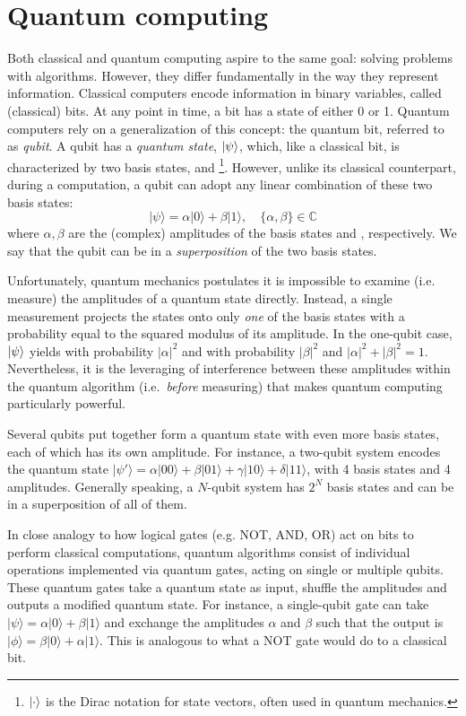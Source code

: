 \section{Quantum computing} \label{sec:intro_quantum_computing}
Both classical and quantum computing aspire to the same goal: solving problems with algorithms. However, they differ fundamentally in the way they represent information. Classical computers encode information in binary variables, called (classical) bits. At any point in time, a bit has a state of either 0 or 1. Quantum computers rely on a generalization of this concept: the quantum bit, referred to as \textit{qubit}. A qubit has a \textit{quantum state}, $\ket{\psi}$, which, like a classical bit, is characterized by two basis states, \0 and \1\footnote{$\ket{\cdot}$ is the Dirac notation for state vectors, often used in quantum mechanics.}. However, unlike its classical counterpart, during a computation, a qubit can adopt any linear combination of these two basis states:
\begin{equation}
|\psi\rangle=\alpha|0\rangle+\beta|1\rangle, \quad \{\alpha, \beta\} \in \mathbb{C}
\end{equation}
where $\alpha, \beta$ are the (complex) amplitudes of the basis states \0 and \1, respectively. We say that the qubit can be in a \textit{superposition} of the two basis states. 

Unfortunately, quantum mechanics postulates it is impossible to examine (i.e. measure) the amplitudes of a quantum state directly. Instead, a single measurement projects the states onto only \textit{one} of the basis states with a probability equal to the squared modulus of its amplitude. In the one-qubit case, $\ket{\psi}$ yields \0 with probability $|\alpha|^2$ and \1 with probability $|\beta|^2$ and $|\alpha|^2 + |\beta|^2 = 1$. Nevertheless, it is the leveraging of interference between these amplitudes within the quantum algorithm (i.e.~\textit{before} measuring) that makes quantum computing particularly powerful.

Several qubits put together form a quantum state with even more basis states, each of which has its own amplitude. For instance, a two-qubit system encodes the quantum state $|\psi'\rangle=\alpha|00\rangle+\beta|01\rangle+\gamma|10\rangle+\delta|11\rangle$, with 4 basis states and 4 amplitudes. Generally speaking, a $N$-qubit system has $2^N$ basis states and can be in a superposition of all of them.

In close analogy to how logical gates (e.g. NOT, AND, OR) act on bits to perform classical computations, quantum algorithms consist of individual operations implemented via quantum gates, acting on single or multiple qubits. These quantum gates take a quantum state as input, shuffle the amplitudes and outputs a modified quantum state. For instance, a single-qubit gate can take $|\psi\rangle=\alpha|0\rangle+\beta|1\rangle$ and exchange the amplitudes $\alpha$ and $\beta$ such that the output is $|\phi\rangle=\beta|0\rangle+\alpha|1\rangle$. This is analogous to what a NOT gate would do to a classical bit. 


